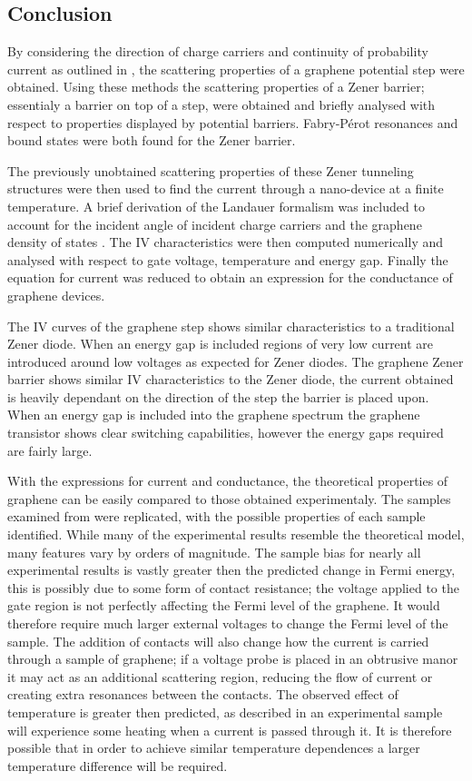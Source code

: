 \documentclass[prl,twocolumn,aps,superscriptaddress,floatfix,10pt]{revtex4}
\begin{document}
\subsection{Conclusion}
	By considering the direction of charge carriers and continuity of probability current as outlined in \cite{b4}, the scattering properties of a graphene potential step were obtained. Using these methods the scattering properties of a Zener barrier; essentialy a barrier on top of a step, were obtained and briefly analysed with respect to properties displayed by potential barriers. Fabry-P\'{e}rot resonances and bound states were both found for the Zener barrier. 
	
	The previously unobtained scattering properties of these Zener tunneling structures were then used to find the current through a nano-device at a finite temperature. A brief derivation of the Landauer formalism \cite{b8} was included to account for the incident angle of incident charge carriers and the graphene density of states \cite{b1}. The IV characteristics were then computed numerically and analysed with respect to gate voltage, temperature and energy gap. Finally the equation for current was reduced to obtain an expression for the conductance of graphene devices.
	
	The IV curves of the graphene step shows similar characteristics to a traditional Zener diode. When an energy gap is included regions of very low current are introduced around low voltages as expected for Zener diodes. The graphene Zener barrier shows similar IV characteristics to the Zener diode, the current obtained is heavily dependant on the direction of the step the barrier is placed upon. When an energy gap is included into the graphene spectrum the graphene transistor shows clear switching capabilities, however the energy gaps required are fairly large.

	With the expressions for current and conductance, the theoretical properties of graphene can be easily compared to those obtained experimentaly. The samples examined from \cite{b11, b12,b13,b14} were replicated, with the possible properties of each sample identified. While many of the experimental results resemble the theoretical model, many features vary by orders of magnitude. The sample bias for nearly all experimental results is vastly greater then the predicted change in Fermi energy, this is possibly due to some form of contact resistance; the voltage applied to the gate region is not perfectly affecting the Fermi level of the graphene. It would therefore require much larger external voltages to change the Fermi level of the sample. The addition of contacts will also change how the current is carried through a sample of graphene; if a voltage probe is placed in an obtrusive manor it may act as an additional scattering region, reducing the flow of current or creating extra resonances between the contacts. The observed effect of temperature is greater then predicted, as described in \cite{b11} an experimental sample will experience some heating when a current is passed through it. It is therefore possible that in order to achieve similar temperature dependences a larger temperature difference will be required. 
\end{document}
